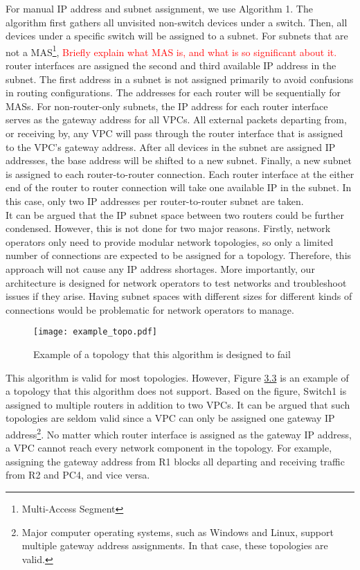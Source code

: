 \documentclass{uiucthesis2021}
\begin{document}
\noindent For manual IP address and subnet assignment, we use Algorithm 1. The algorithm first gathers all unvisited non-switch devices under a switch. Then, all devices under a specific switch will be assigned to a subnet. For subnets that are not a MAS\footnote{Multi-Access Segment}, \textcolor{red}{Briefly explain what MAS is, and what is so significant about it.} router interfaces are assigned the second and third available IP address in the subnet. The first address in a subnet is not assigned primarily to avoid confusions in routing configurations. The addresses for each router will be sequentially for MASs. For non-router-only subnets, the IP address for each router interface serves as the gateway address for all VPCs. All external packets departing from, or receiving by, any VPC will pass through the router interface that is assigned to the VPC's gateway address. After all devices in the subnet are assigned IP addresses, the base address will be shifted to a new subnet. Finally, a new subnet is assigned to each router-to-router connection. Each router interface at the either end of the router to router connection will take one available IP in the subnet. In this case, only two IP addresses per router-to-router subnet are taken. \\

\noindent It can be argued that the IP subnet space between two routers could be further condensed. However, this is not done for two major reasons. Firstly, network operators only need to provide modular network topologies, so only a limited number of connections are expected to be assigned for a topology. Therefore, this approach will not cause any IP address shortages. More importantly, our architecture is designed for network operators to test networks and troubleshoot issues if they arise. Having subnet spaces with different sizes for different kinds of connections would be problematic for network operators to manage.\\ 

\label{f33}
\begin{figure}[H]
\texttt{[image: example\_topo.pdf]}
\centering
\caption{Example of a topology that this algorithm is designed to fail}
\centering
\end{figure}

\noindent This algorithm is valid for most topologies. However, Figure \hyperref[f33]{3.3} is an example of a topology that this algorithm does not support. Based on the figure, Switch1 is assigned to multiple routers in addition to two VPCs. It can be argued that such topologies are seldom valid since a VPC can only be assigned one gateway IP address\footnote{Major computer operating systems, such as Windows and Linux, support multiple gateway address assignments. In that case, these topologies are valid.}. No matter which router interface is assigned as the gateway IP address, a VPC cannot reach every network component in the topology. For example, assigning the gateway address from R1 blocks all departing and receiving traffic from R2 and PC4, and vice versa. \\
\end{document}
